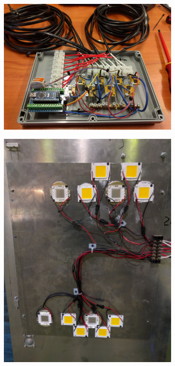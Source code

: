 \documentclass[fleqn,twoside,12pt]{report}
\begin{document}
\begin{figure}[h]
	\centering
	\begin{subfigure}{0.4\textwidth}
		\centering
		\includegraphics[width=0.9\linewidth]{mosfet_arduino.jpg}
		\caption{}
		\label{fig:mosfet_arduino}
	\end{subfigure}%
	\begin{subfigure}{0.25\textwidth}
		\centering
		\includegraphics[width=0.8\linewidth]{LED_door_1.jpg}
		\caption{}

\end{subfigure}
\end{figure}
\end{document}
